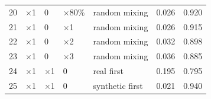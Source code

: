 \documentclass[letterpaper]{article} %
\begin{document}
\begin{table}[t]
{\begin{tabular}{lllllll}
			20& $\times$1    	&0 		&  $\times$80\% 	&random mixing &0.026 &0.920 \\
			21& $\times$1 	 	&0 		&  $\times$1    &random mixing &0.026 &0.915 \\
			22& $\times$1 	 	&0 		&  $\times$2   &random mixing &0.032 &0.898 \\
			23& $\times$1 	 	&0 		&  $\times$3   &random mixing &0.036 &0.885 \\			
			24& $\times$1 	 	& $\times$1 	&0  		&real first &0.195 &0.795 \\
			25& $\times$1 	 	& $\times$1 	&0  		&synthetic first &0.021 &0.940 \\
			\bottomrule
		\end{tabular}
	}
	\label{availability_test}
\end{table}
\end{document}
